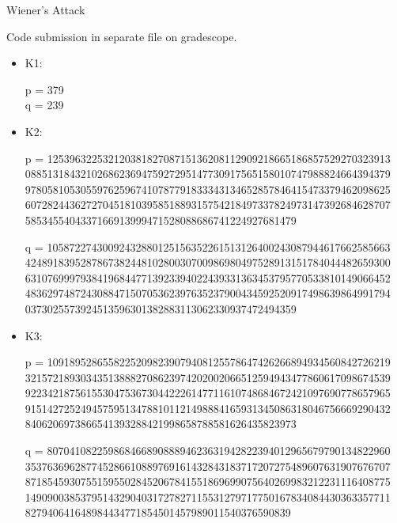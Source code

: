 \documentclass[11pt, nopagenumbers]{adamblan-hw}
\begin{document}
\begin{question}{\color{red} Wiener's Attack}
\pagebreak

\begin{part}
Code submission in separate file on gradescope.


\begin{itemize}
\item K1:

p = 379 \\
q = 239

\item K2:

p = 12539632253212038182708715136208112909218665186857529270323913\\
088513184321026862369475927295147730917565158010747988824664394379\\
978058105305597625967410787791833343134652857846415473379462098625\\
607282443627270451810395851889315754218497337824973147392684628707\\
5853455404337166913999471528088686741224927681479

q = 10587227430092432880125156352261513126400243087944617662585663\\
424891839528786738244810280030700986980497528913151784044482659300\\
631076999793841968447713923394022439331363453795770533810149066452\\
483629748724308847150705362397635237900434592520917498639864991794\\
0373025573924513596301382883113062330937472494359
\item K3:

p = 10918952865582252098239079408125578647426266894934560842726219\\
321572189303435138882708623974202002066512594943477860617098674539\\
922342187561553047536730442226147711610748684672421097690778657965\\
915142725249457595134788101121498884165931345086318046756669290432\\
8406206973866541393288421998658788581626435823973

q = 80704108225986846689088894623631942822394012965679790134822960\\
353763696287745286610889769161432843183717207275489607631907676707\\
871854593075515955028452067841551869699075640269983212231116408775\\
149090038537951432904031727827115531279717750167834084430363357711\\
827940641648984434771854501457989011540376590839

\end{itemize}
\end{part}
\end{question}
\end{document}

